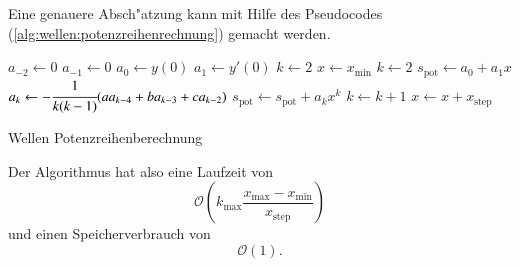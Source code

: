 Eine genauere Absch"atzung kann mit Hilfe des Pseudocodes 
(\ref{alg:wellen:potenzreihenrechnung}) gemacht werden.

\begin{algorithm}
	\begin{algorithmic}[1]
		\State $a_{-2} \gets 0$
		\State $a_{-1} \gets 0$
		\State $a_0 \gets y(0)$
		\State $a_1 \gets y'(0)$
		\State $k \gets 2$
		\State $x \gets x_{\text{min}}$
			\State $k \gets 2$
			\State $s_{\text{pot}} \gets a_0 + a_1x$
				\State $a_k \gets -\cfrac{1}{k(k-1)}			
				(aa_{k-4}+ba_{k-3}+ca_{k-2})$
				\State $s_{\text{pot}} \gets s_{\text{pot}} + a_k x^k$
				\State $k \gets k + 1$
			\EndFor
			\State $x \gets x + x_{\text{step}}$
		\EndFor
	\end{algorithmic}
	\caption{Wellen Potenzreihenberechnung} 
	\label{alg:wellen:potenzreihenrechnung}
\end{algorithm}

Der Algorithmus hat also eine Laufzeit von
\begin{equation*}
	\mathcal{O}
	\left(
		k_{\text{max}}\frac{x_{\text{max}}-x_{\text{min}}}{x_{\text{step}}}
	\right)
\end{equation*}
und einen Speicherverbrauch von
\begin{equation*}
	\mathcal{O}
	\left(
	1
	\right).
\end{equation*}